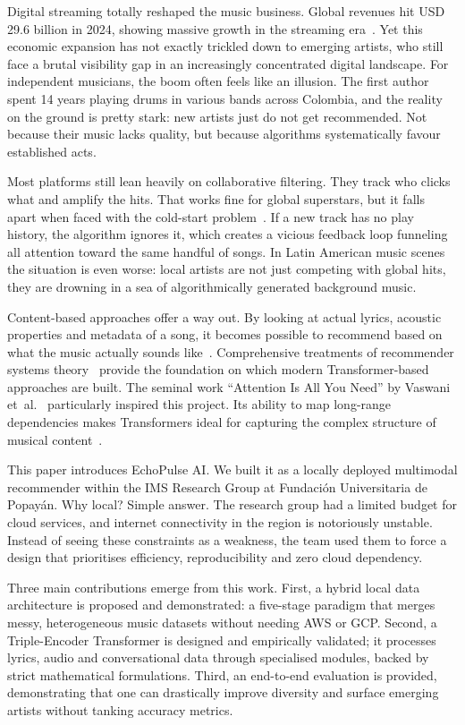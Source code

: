 \documentclass[]{ceurart}
\begin{document}
Digital streaming totally reshaped the music business. Global revenues hit USD
29.6 billion in 2024, showing massive growth in the streaming
era~\cite{ifpi2025report}. Yet this economic expansion has not exactly trickled
down to emerging artists, who still face a brutal visibility gap in an
increasingly concentrated digital landscape. For independent musicians, the
boom often feels like an illusion. The first author spent 14 years playing
drums in various bands across Colombia, and the reality on the ground is
pretty stark: new artists just do not get recommended. Not because their music
lacks quality, but because algorithms systematically favour established acts.

Most platforms still lean heavily on collaborative filtering. They track who
clicks what and amplify the hits. That works fine for global superstars, but
it falls apart when faced with the cold-start problem~\cite{schein2002methods,
adomavicius2005toward}. If a new track has no play history, the algorithm
ignores it, which creates a vicious feedback loop funneling all attention
toward the same handful of songs. In Latin American music scenes the situation
is even worse: local artists are not just competing with global hits, they are
drowning in a sea of algorithmically generated background music.

Content-based approaches offer a way out. By looking at actual lyrics, acoustic
properties and metadata of a song, it becomes possible to recommend based on
what the music actually sounds like~\cite{ricci2015recommender}. Comprehensive
treatments of recommender systems theory~\cite{aggarwal2016recommender} provide
the foundation on which modern Transformer-based approaches are built. The
seminal work ``Attention Is All You Need'' by Vaswani
et~al.~\cite{vaswani2017attention} particularly inspired this project. Its
ability to map long-range dependencies makes Transformers ideal for capturing
the complex structure of musical content~\cite{baltruvsaitis2019multimodal}.

This paper introduces EchoPulse AI. We built it as a locally deployed
multimodal recommender within the IMS Research Group at Fundación Universitaria
de Popayán. Why local? Simple answer. The research group had a limited budget
for cloud services, and internet connectivity in the region is notoriously
unstable. Instead of seeing these constraints as a weakness, the team used them
to force a design that prioritises efficiency, reproducibility and zero cloud
dependency.

Three main contributions emerge from this work. First, a hybrid local data
architecture is proposed and demonstrated: a five-stage paradigm that merges
messy, heterogeneous music datasets without needing AWS or GCP. Second, a
Triple-Encoder Transformer is designed and empirically validated; it processes
lyrics, audio and conversational data through specialised modules, backed by
strict mathematical formulations. Third, an end-to-end evaluation is provided,
demonstrating that one can drastically improve diversity and surface emerging
artists without tanking accuracy metrics.
\end{document}
